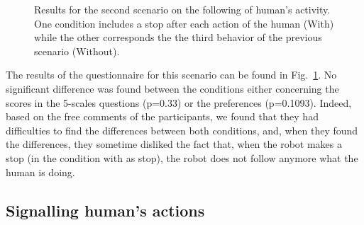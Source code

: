 \documentclass[english,a4paper,11pt,twoside]{StyleThese}
\begin{document}
\begin{figure}[!h]
\centering
    \caption{Results for the second scenario on the following of human's activity. One condition includes a stop after each action of the human (With) while the other corresponds the the third behavior of the previous scenario (Without).}
    \label{fig:resSce3}
\end{figure}

The results of the questionnaire for this scenario can be found in Fig.~\ref{fig:resSce3}. No significant difference was found between the conditions either concerning the scores in the 5-scales questions (p=0.33) or the preferences (p=0.1093). Indeed, based on the free comments of the participants, we found that they had difficulties to find the differences between both conditions, and, when they found the differences, they sometime disliked the fact that, when the robot makes a stop (in the condition with as stop), the robot does not follow anymore what the human is doing.


\subsection{Signalling human's actions}
\end{document}
